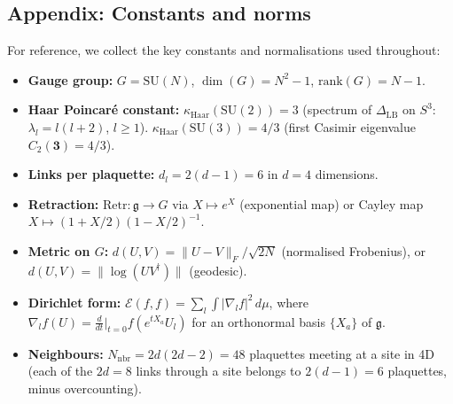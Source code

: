 \documentclass[12pt,a4paper]{article}
\theoremstyle{definition}
\theoremstyle{plain}
\theoremstyle{remark}
\begin{document}
\subsection*{Appendix: Constants and norms}
\label{app:constants}

For reference, we collect the key constants and normalisations used throughout:

\begin{itemize}
\item \textbf{Gauge group:} $G = \mathrm{SU}(N)$, $\dim(G) = N^2 - 1$, $\mathrm{rank}(G) = N-1$.
\item \textbf{Haar Poincar\'e constant:} $\kappa_{\mathrm{Haar}}(\mathrm{SU}(2)) = 3$ (spectrum of $\Delta_{\mathrm{LB}}$ on $S^3$: $\lambda_l = l(l+2)$, $l \geq 1$). $\kappa_{\mathrm{Haar}}(\mathrm{SU}(3)) = 4/3$ (first Casimir eigenvalue $C_2(\mathbf{3}) = 4/3$).
\item \textbf{Links per plaquette:} $d_l = 2(d-1) = 6$ in $d = 4$ dimensions.
\item \textbf{Retraction:} $\mathrm{Retr}: \mathfrak{g} \to G$ via $X \mapsto e^X$ (exponential map) or Cayley map $X \mapsto (1 + X/2)(1 - X/2)^{-1}$.
\item \textbf{Metric on $G$:} $d(U, V) = \|U - V\|_F / \sqrt{2N}$ (normalised Frobenius), or $d(U, V) = \|\log(U V^\dagger)\|$ (geodesic).
\item \textbf{Dirichlet form:} $\mathcal{E}(f, f) = \sum_l \int |\nabla_l f|^2 \, d\mu$, where $\nabla_l f(U) = \frac{d}{dt}\big|_{t=0} f(e^{tX_a} U_l)$ for an orthonormal basis $\{X_a\}$ of $\mathfrak{g}$.
\item \textbf{Neighbours:} $N_{\mathrm{nbr}} = 2d(2d - 2) = 48$ plaquettes meeting at a site in 4D (each of the $2d = 8$ links through a site belongs to $2(d-1) = 6$ plaquettes, minus overcounting).
\end{itemize}
\end{document}
